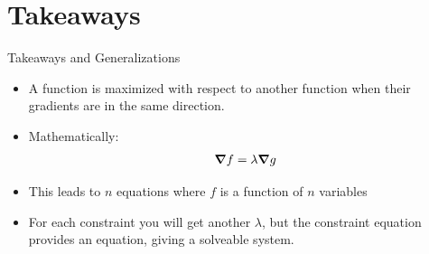 \documentclass{beamer}
\begin{document}
\section{Takeaways}
\begin{frame}{Takeaways and Generalizations}
  \begin{itemize}
  \item A function is maximized with respect to another function when their gradients are in the same direction.
  \item Mathematically:
    \begin{align*}
      \grad{f}=\lambda\grad{g}
    \end{align*}
  \item This leads to $n$ equations where $f$ is a function of $n$ variables
  \item For each constraint you will get another $\lambda$, but the constraint equation provides an equation, giving a solveable system. 
  \end{itemize}
\end{frame}
\end{document}
